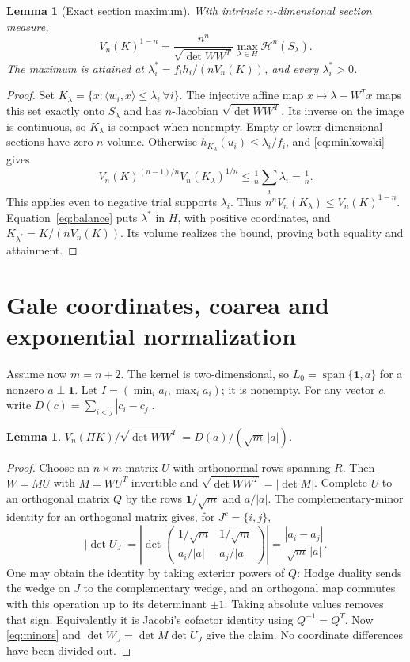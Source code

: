 \documentclass[11pt]{article}
\newtheorem{lemma}[theorem]{Lemma}
\theoremstyle{remark}\newtheorem{remark}[theorem]{Remark}
\newcommand{\HH}{\mathcal H}
\newcommand{\one}{\mathbf 1}
\numberwithin{equation}{section}
\begin{document}
\begin{lemma}[Exact section maximum]\label{lem:maximum}
With intrinsic $n$-dimensional section measure,
\begin{equation}\label{eq:maximum}
 V_n(K)^{1-n}=
 \frac{n^n}{\sqrt{\det WW^T}}\max_{\lambda\in H}\HH^n(S_\lambda).
\end{equation}
The maximum is attained at
$\lambda_i^*=f_i h_i/(nV_n(K))$, and every $\lambda_i^*>0$.
\end{lemma}
\begin{proof}
Set $K_\lambda=\{x:\langle w_i,x\rangle\le\lambda_i\ \forall i\}$.
The injective affine map $x\mapsto\lambda-W^Tx$ maps this set exactly
onto $S_\lambda$ and has $n$-Jacobian $\sqrt{\det WW^T}$.
Its inverse on the image is continuous, so $K_\lambda$ is compact when
nonempty. Empty or lower-dimensional sections have zero $n$-volume.
Otherwise $h_{K_\lambda}(u_i)\le\lambda_i/f_i$, and
\eqref{eq:minkowski} gives
\[
 V_n(K)^{(n-1)/n}V_n(K_\lambda)^{1/n}
 \le\tfrac1n\sum_i\lambda_i=\tfrac1n.
\]
This applies even to negative trial supports $\lambda_i$.
Thus $n^nV_n(K_\lambda)\le V_n(K)^{1-n}$.
Equation~\eqref{eq:balance} puts $\lambda^*$ in $H$, with positive
coordinates, and $K_{\lambda^*}=K/(nV_n(K))$. Its volume realizes
the bound, proving both equality and attainment.
\end{proof}

\section{Gale coordinates, coarea and exponential normalization}
Assume now $m=n+2$. The kernel is two-dimensional, so
$L_0=\operatorname{span}\{\one,a\}$ for a nonzero $a\perp\one$.
Let $I=(\min_i a_i,\max_i a_i)$; it is nonempty.
For any vector $c$, write $D(c)=\sum_{i<j}|c_i-c_j|$.

\begin{lemma}\label{lem:gale}
$V_n(\Pi K)/\sqrt{\det WW^T}=D(a)/(\sqrt m\,|a|)$.
\end{lemma}
\begin{proof}
Choose an $n\times m$ matrix $U$ with orthonormal rows spanning $R$.
Then $W=MU$ with $M=WU^T$ invertible and
$\sqrt{\det WW^T}=|\det M|$.
Complete $U$ to an orthogonal matrix $Q$ by the rows
$\one/\sqrt m$ and $a/|a|$. The complementary-minor identity for
an orthogonal matrix gives, for $J^c=\{i,j\}$,
\[
 |\det U_J|=\left|\det
 \begin{pmatrix}1/\sqrt m&1/\sqrt m\\ a_i/|a|&a_j/|a|\end{pmatrix}\right|
 =\frac{|a_i-a_j|}{\sqrt m\,|a|}.
\]
One may obtain the identity by taking exterior powers of $Q$:
Hodge duality sends the wedge on $J$ to the complementary wedge, and
an orthogonal map commutes with this operation up to its determinant
$\pm1$. Taking absolute values removes that sign. Equivalently it is
Jacobi's cofactor identity using $Q^{-1}=Q^T$.
Now \eqref{eq:minors} and $\det W_J=\det M\det U_J$ give the claim.
No coordinate differences have been divided out.
\end{proof}
\end{document}
